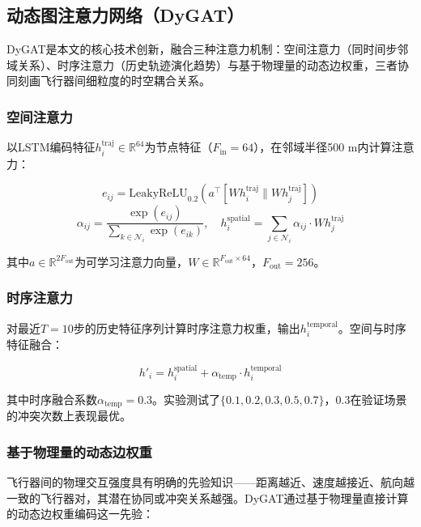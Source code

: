 \documentclass[12pt,a4paper,UTF8]{ctexart}
\begin{document}
\subsection{动态图注意力网络（DyGAT）}

DyGAT是本文的核心技术创新，融合三种注意力机制：空间注意力（同时间步邻域关系）、时序注意力（历史轨迹演化趋势）与基于物理量的动态边权重，三者协同刻画飞行器间细粒度的时空耦合关系。

\subsubsection{空间注意力}

以LSTM编码特征$h_i^{\text{traj}} \in \mathbb{R}^{64}$为节点特征（$F_{\text{in}}=64$），在邻域半径500 m内计算注意力：

\begin{equation}
    e_{ij} = \text{LeakyReLU}_{0.2}\!\left(a^{\top}[W h_i^{\text{traj}} \parallel W h_j^{\text{traj}}]\right)
\end{equation}
\begin{equation}
    \alpha_{ij} = \frac{\exp(e_{ij})}{\sum_{k \in \mathcal{N}_i} \exp(e_{ik})},\quad
    h_i^{\text{spatial}} = \sum_{j \in \mathcal{N}_i} \alpha_{ij} \cdot W h_j^{\text{traj}}
\end{equation}

其中$a \in \mathbb{R}^{2F_{\text{out}}}$为可学习注意力向量，$W \in \mathbb{R}^{F_{\text{out}} \times 64}$，$F_{\text{out}}=256$。

\subsubsection{时序注意力}

对最近$T=10$步的历史特征序列计算时序注意力权重，输出$h_i^{\text{temporal}}$。空间与时序特征融合：

\begin{equation}
    h'_i = h_i^{\text{spatial}} + \alpha_{\text{temp}} \cdot h_i^{\text{temporal}}
\end{equation}

其中时序融合系数$\alpha_{\text{temp}} = 0.3$。实验测试了$\{0.1, 0.2, 0.3, 0.5, 0.7\}$，0.3在验证场景的冲突次数上表现最优。

\subsubsection{基于物理量的动态边权重}

飞行器间的物理交互强度具有明确的先验知识——距离越近、速度越接近、航向越一致的飞行器对，其潜在协同或冲突关系越强。DyGAT通过基于物理量直接计算的动态边权重编码这一先验：
\end{document}
